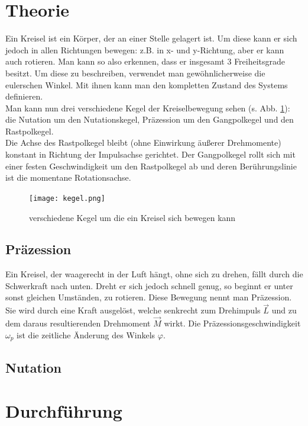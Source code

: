\documentclass[12pt,a4paper,titlepage,headinclude,bibtotoc]{scrartcl}
\begin{document}
\section{Theorie}
\label{sec:theorie}
Ein Kreisel ist ein Körper, der an einer Stelle gelagert ist.
Um diese kann er sich jedoch in allen Richtungen bewegen: z.B. in x- und y-Richtung, aber er kann auch rotieren.
Man kann so also erkennen, dass er insgesamt 3 Freiheitsgrade besitzt.
Um diese zu beschreiben, verwendet man gewöhnlicherweise die eulerschen Winkel.
Mit ihnen kann man den kompletten Zustand des Systems definieren.\\
Man kann nun drei verschiedene Kegel der Kreiselbewegung sehen (s. Abb. \ref{img:kegel}): die Nutation um den Nutationskegel, Präzession um den Gangpolkegel und den Rastpolkegel.\\
Die Achse des Rastpolkegel bleibt (ohne Einwirkung äußerer Drehmomente) konstant in Richtung der Impulsachse gerichtet.
Der Gangpolkegel rollt sich mit einer festen Geschwindigkeit um den Rastpolkegel ab und deren Berührungslinie ist die momentane Rotationsachse.


\begin{figure}
\texttt{[image: kegel.png]}
\caption{verschiedene Kegel um die ein Kreisel sich bewegen kann\label{img:kegel}}
\end{figure}

\subsection{Präzession}
Ein Kreisel, der waagerecht in der Luft hängt, ohne sich zu drehen, fällt durch die Schwerkraft nach unten.
Dreht er sich jedoch schnell genug, so beginnt er unter sonst gleichen Umständen, zu rotieren. Diese Bewegung nennt man Präzession.
Sie wird durch eine Kraft ausgelöst, welche senkrecht zum Drehimpuls $\vec L$ und zu dem daraus resultierenden Drehmoment $\vec M$ wirkt.
Die Präzessionsgeschwindigkeit $\omega_p$ ist die zeitliche Änderung des Winkels $\varphi$.

\subsection{Nutation}
 
\section{Durchführung}
\label{sec:durchfuehrung}
\end{document}
